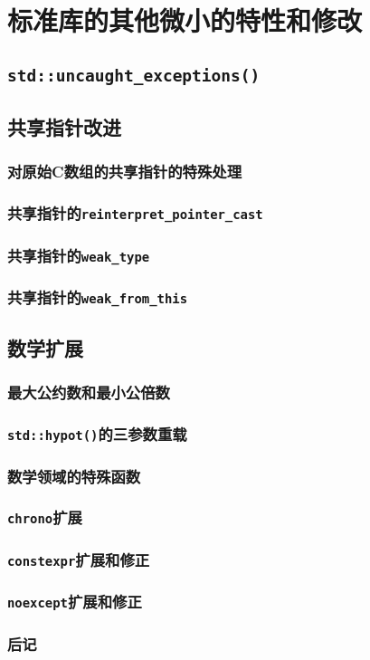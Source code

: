 \section{标准库的其他微小的特性和修改}\label{ch28}

\subsection{\texttt{std::uncaught\_exceptions()}}

\subsection{共享指针改进}

\subsubsection{对原始C数组的共享指针的特殊处理}\label{ch28.2.1}

\subsubsection{共享指针的\texttt{reinterpret\_pointer\_cast}}

\subsubsection{共享指针的\texttt{weak\_type}}

\subsubsection{共享指针的\texttt{weak\_from\_this}}

\subsection{数学扩展}

\subsubsection{最大公约数和最小公倍数}

\subsubsection{\texttt{std::hypot()}的三参数重载}

\subsubsection{数学领域的特殊函数}

\subsubsection{\texttt{chrono}扩展}

\subsubsection{\texttt{constexpr}扩展和修正}\label{ch28.5}

\subsubsection{\texttt{noexcept}扩展和修正}

\subsubsection{后记}